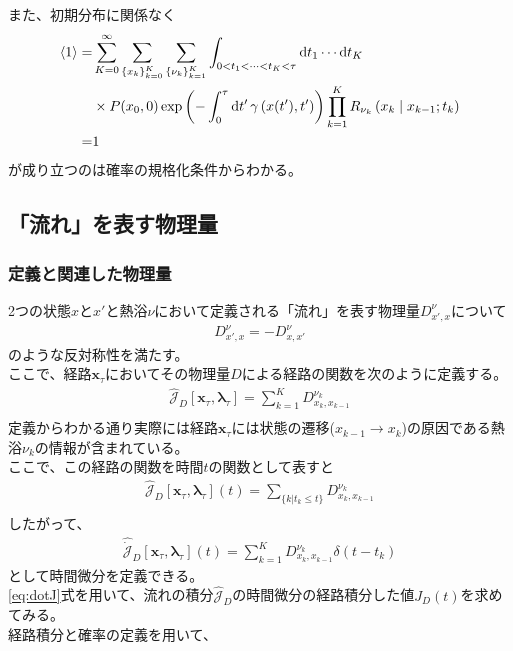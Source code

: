 \documentclass{ltjsarticle}
\begin{document}
また、初期分布に関係なく
\begin{align}
  \ev{1}=&\sum_{K=0}^{\infty}\sum_{\lbrace x_k\rbrace_{k=0}^K}\sum_{\lbrace\nu_k\rbrace_{k=1}^K}\int_{0<t_1<\cdots<t_K<\tau}\dd{t_1}\cdots \dd{t_K}\\
  &\times P(x_0,0)\exp\left(-\int_0^\tau \dd{t'}\gamma\left(x(t'),t'\right)\right)\prod_{k=1}^K R_{\nu_k}\left(x_k\mid x_{k-1};t_k\right)\\
  =&1
\end{align}
が成り立つのは確率の規格化条件からわかる。
\subsection{「流れ」を表す物理量}
\subsubsection{定義と関連した物理量}
2つの状態$x$と$x'$と熱浴$\nu$において定義される「流れ」を表す物理量$D^\nu_{x',x}$について\\
\begin{align}
  D^\nu_{x',x}=-D^\nu_{x,x'}
\end{align}
のような反対称性を満たす。\\
ここで、経路$\bm{x}_\tau$においてその物理量$D$による経路の関数を次のように定義する。
\begin{align}
  \hat{\mathcal{J}}_D[\bm{x}_\tau,\bm{\lambda}_\tau]=\sum^K_{k=1}D^{\nu_k}_{x_k,x_{k-1}}\\
\end{align}
定義からわかる通り実際には経路$\bm{x}_\tau$には状態の遷移($x_{k-1}\to x_k$)の原因である熱浴$\nu_k$の情報が含まれている。\\
ここで、この経路の関数を時間$t$の関数として表すと
\begin{align}
  \hat{\mathcal{J}}_D[\bm{x}_\tau,\bm{\lambda}_\tau](t)=\sum_{\lbrace k|t_k \le t\rbrace}D^{\nu_k}_{x_k,x_{k-1}}\\
\end{align}
したがって、
\begin{align}
  \hat{\dot{\mathcal{J}}}_D[\bm{x}_\tau,\bm{\lambda}_\tau](t)=\sum_{k=1}^K D^{\nu_k}_{x_{k},x_{k-1}}\delta(t-t_k)\label{eq:dotJ}
\end{align}
として時間微分を定義できる。\\
\eqref{eq:dotJ}式を用いて、流れの積分$\hat{\mathcal{J}}_D$の時間微分の経路積分した値$J_D(t)$を求めてみる。\\
経路積分と確率の定義を用いて、
\end{document}
